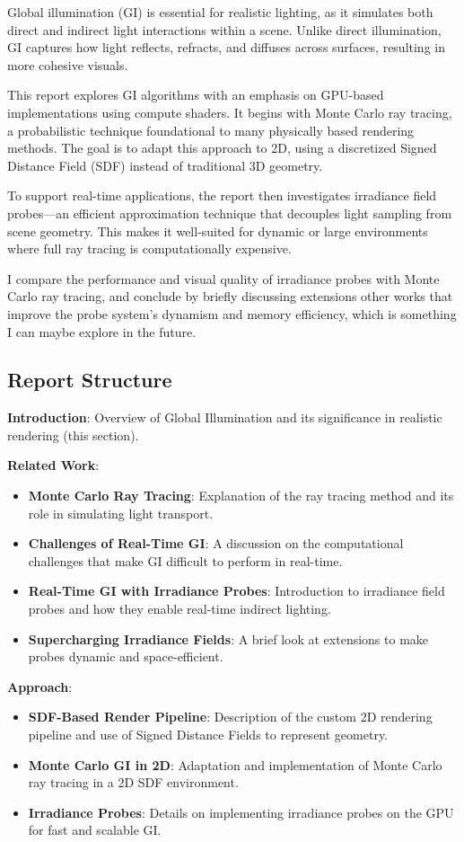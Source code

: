 \documentclass[acmtog, nonacm]{acmart}
\begin{document}
Global illumination (GI) is essential for realistic lighting, as it simulates both direct and indirect light interactions within a scene. Unlike direct illumination, GI captures how light reflects, refracts, and diffuses across surfaces, resulting in more cohesive visuals.

This report explores GI algorithms with an emphasis on GPU-based implementations using compute shaders. It begins with Monte Carlo ray tracing, a probabilistic technique foundational to many physically based rendering methods. The goal is to adapt this approach to 2D, using a discretized Signed Distance Field (SDF) instead of traditional 3D geometry.

To support real-time applications, the report then investigates irradiance field probes—an efficient approximation technique that decouples light sampling from scene geometry. This makes it well-suited for dynamic or large environments where full ray tracing is computationally expensive.

I compare the performance and visual quality of irradiance probes with Monte Carlo ray tracing, and conclude by briefly discussing extensions other works that improve the probe system’s dynamism and memory efficiency, which is something I can maybe explore in the future.

\subsection{Report Structure}

\textbf{Introduction}: Overview of Global Illumination and its significance in realistic rendering (this section).

\textbf{Related Work}:
\begin{itemize}
  \item \textbf{Monte Carlo Ray Tracing}: Explanation of the ray tracing method and its role in simulating light transport.
  \item \textbf{Challenges of Real-Time GI}: A discussion on the computational challenges that make GI difficult to perform in real-time.
  \item \textbf{Real-Time GI with Irradiance Probes}: Introduction to irradiance field probes and how they enable real-time indirect lighting.
  \item \textbf{Supercharging Irradiance Fields}: A brief look at extensions to make probes dynamic and space-efficient.
\end{itemize}

\textbf{Approach}:
\begin{itemize}
  \item \textbf{SDF-Based Render Pipeline}: Description of the custom 2D rendering pipeline and use of Signed Distance Fields to represent geometry.
  \item \textbf{Monte Carlo GI in 2D}: Adaptation and implementation of Monte Carlo ray tracing in a 2D SDF environment.
  \item \textbf{Irradiance Probes}: Details on implementing irradiance probes on the GPU for fast and scalable GI.
\end{itemize}
\end{document}
